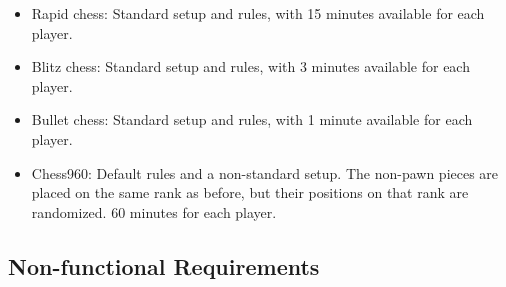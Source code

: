 \documentclass{article}
\begin{document}
\begin{itemize}
\begin{itemize}
\begin{itemize}
			\item Rapid chess: Standard setup and rules, with 15 minutes available for each player.
			\item Blitz chess: Standard setup and rules, with 3 minutes available for each player.
			\item Bullet chess: Standard setup and rules, with 1 minute available for each player.
			\item Chess960: Default rules and a non-standard setup. The non-pawn pieces are placed on the same rank as before, but their positions on that rank are randomized. 60 minutes for each player.
		\end{itemize}
	\end{itemize}
\end{itemize}

\subsection{Non-functional Requirements}
\end{document}

